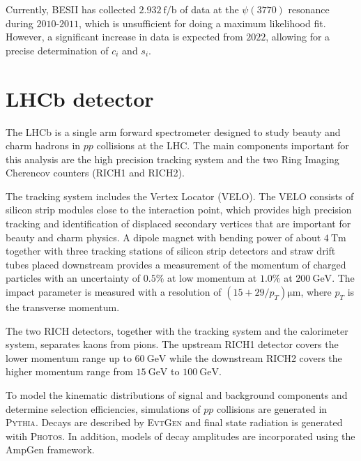 \documentclass[12pt, a4paper, notitlepage, onecolumn]{article}
\def\pythia{\mbox{\textsc{Pythia}}\xspace}
\def\evtgen{\mbox{\textsc{EvtGen}}\xspace}
\def\photos{\mbox{\textsc{Photos}}\xspace}
\numberwithin{equation}{section}
\begin{document}
Currently, BESII has collected $\SI{2.932}{\femto\per\barn}$ of data at the $\psi(3770)$ resonance during $2010$-$2011$, which is unsufficient for doing a maximum likelihood fit. However, a significant increase in data is expected from $2022$, allowing for a precise determination of $c_i$ and $s_i$.
\section{LHCb detector}
\noindent The LHCb is a single arm forward spectrometer designed to study beauty and charm hadrons in $pp$ collisions at the LHC. The main components important for this analysis are the high precision tracking system and the two Ring Imaging Cherencov counters (RICH1 and RICH2).

The tracking system includes the Vertex Locator (VELO). The VELO consists of silicon strip modules close to the interaction point, which provides high precision tracking and identification of displaced secondary vertices that are important for beauty and charm physics. A dipole magnet with bending power of about $\SI{4}{\tesla\meter}$ together with three tracking stations of silicon strip detectors and straw drift tubes placed downstream provides a measurement of the momentum of charged particles with an uncertainty of $0.5\%$ at low momentum at $1.0\%$ at $\SI{200}{\giga\eV}$. The impact parameter is measured with a resolution of $(15 + 29/p_T)\si{\micro\meter}$, where $p_T$ is the transverse momentum.

The two RICH detectors, together with the tracking system and the calorimeter system, separates kaons from pions. The upstream RICH1 detector covers the lower momentum range up to $\SI{60}{\giga\eV}$ while the downstream RICH2 covers the higher momentum range from $\SI{15}{\giga\eV}$ to $\SI{100}{\giga\eV}$.

To model the kinematic distributions of signal and background components and determine selection efficiencies, simulations of $pp$ collisions are generated in \pythia. Decays are described by \evtgen and final state radiation is generated witih \photos. In addition, models of decay amplitudes are incorporated using the AmpGen framework.

\end{document}
